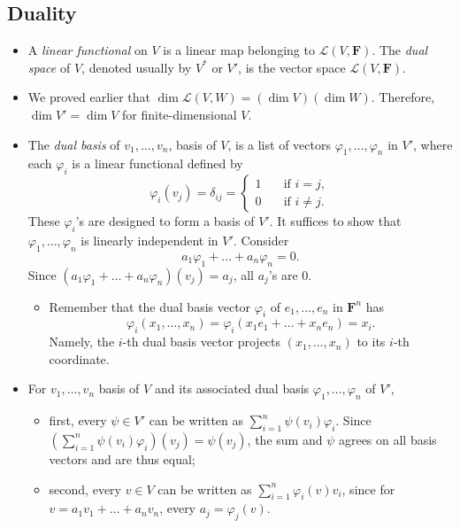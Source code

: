 \documentclass[11pt]{article}
\newcommand{\df}[1]{\textit{\textsf{#1}}}
\newcommand{\F}{\mathbf{F}}
\renewcommand{\d}{\dim}
\newcommand{\LVW}{\mathcal{L}(V,W)}
\renewcommand{\phi}{\varphi}
\begin{document}
\subsection{Duality}
\begin{itemize}
    \item A \df{linear functional} on $V$ is a linear map belonging to $\mathcal{L}(V,\F)$. The \df{dual space} of $V$, denoted usually by $V^*$ or $V'$, is the vector space $\mathcal{L}(V,\F)$.
    \item We proved earlier that $\d \LVW = (\d V)(\d W)$. Therefore, $\d V' = \d V$ for finite-dimensional $V$.
    \item The \df{dual basis} of $v_1,\dots,v_n$, basis of $V$, is a list of vectors $\phi_1,\dots,\phi_n$ in $V'$, where each $\phi_i$ is a linear functional defined by
    \begin{equation*}
        \phi_i(v_j) = \delta_{ij} = \left\{
            \begin{array}{rl}
                1 \quad & \text{if } i = j, \\
                0 \quad & \text{if } i \not= j.
            \end{array}
        \right.
    \end{equation*}
    These $\phi_i$'s are designed to form a basis of $V'$. It suffices to show that $\phi_1,\dots,\phi_n$ is linearly independent in $V'$. Consider $$a_1\phi_1+\dots+a_n\phi_n=0.$$ Since $(a_1\phi_1+\dots+a_n\phi_n)(v_j)=a_j$, all $a_j$'s are 0.
    \begin{itemize}
        \item Remember that the dual basis vector $\phi_i$ of $e_1,\dots,e_n$ in $\F^n$ has $$\phi_i(x_1,\dots,x_n)=\phi_i(x_1e_1+\dots+x_ne_n)=x_i.$$ Namely, the $i$-th dual basis vector projects $(x_1,\dots,x_n)$ to its $i$-th coordinate.
    \end{itemize}
    \item For $v_1,\dots,v_n$ basis of $V$ and its associated dual basis $\phi_1,\dots,\phi_n$ of $V'$, 
    \begin{itemize}
        \item first, every $\psi \in V'$ can be written as $\sum_{i=1}^n \psi(v_i)\phi_i$. Since $(\sum_{i=1}^n \psi(v_i)\phi_i)(v_j) = \psi(v_j)$, the sum and $\psi$ agrees on all basis vectors and are thus equal;
        \item second, every $v \in V$ can be written as $\sum_{i=1}^n \phi_i(v)v_i$, since for $v = a_1v_1 + \dots +a_nv_n$, every $a_j = \phi_j(v)$.
    \end{itemize}

\end{itemize}
\end{document}
